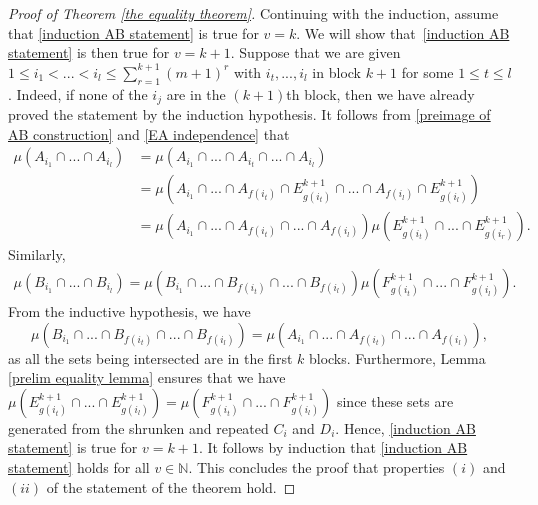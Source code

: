 \documentclass[12pt]{article}
\begin{document}
\begin{proof}[Proof of Theorem \ref{the equality theorem}]
    Continuing with the induction, assume that \eqref{induction AB statement} is true for $v=k$. We will show that~\eqref{induction AB statement} is then true for $v=k+1$. Suppose that we are given $1\leq i_1<...<i_l\leq \sum_{r=1}^{k+1}(m+1)^r$ with $i_t,...,i_l$ in block $k+1$ for some $1 \leq t \leq l$. Indeed, if none of the $i_j$ are in the $(k+1)$th block, then we have already proved the statement by the induction hypothesis. 
    It follows from \eqref{preimage of AB construction} and \eqref{EA independence} that
    \begin{align*}
        \mu(A_{i_1} \cap ... \cap A_{i_l})&=\mu(A_{i_1} \cap ... \cap A_{i_{t}} \cap ... \cap A_{i_l}) \\
        &=\mu\left(A_{i_1} \cap ... \cap {A}_{f(i_t)}\cap {E}_{g(i_t)}^{k+1} \cap ... \cap {A}_{f(i_l)}\cap {E}_{g(i_l)}^{k+1} \right) \\
        &=\mu\left(A_{i_1} \cap ... \cap {A}_{f(i_t)} \cap ... \cap {A}_{f(i_l)}\right) \mu\left({E}_{g(i_t)}^{k+1} \cap ... \cap {E}_{g(i_r)}^{k+1} \right).
    \end{align*}
    Similarly,
    \begin{align*}
        \mu(B_{i_1} \cap ... \cap B_{i_l})=\mu\left(B_{i_1} \cap ... \cap {B}_{f(i_t)} \cap ... \cap {B}_{f(i_l)}\right) \mu\left({F}_{g(i_t)}^{k+1} \cap ... \cap {F}_{g(i_l)}^{k+1} \right).
    \end{align*}
    From the inductive hypothesis, we have 
    \[\mu\left(B_{i_1} \cap ... \cap {B}_{f(i_t)} \cap ... \cap {B}_{f(i_l)}\right)= \mu\left(A_{i_1} \cap ... \cap {A}_{f(i_t)} \cap ... \cap {A}_{f(i_l)} \right),\] as all the sets being intersected are in the first $k$ blocks. Furthermore, Lemma \ref{prelim equality lemma} ensures that we have $\mu\left({E}_{g(i_t)}^{k+1} \cap ... \cap {E}_{g(i_l)}^{k+1} \right)=\mu\left({F}_{g(i_t)}^{k+1} \cap ... \cap {F}_{g(i_l)}^{k+1} \right)$ since these sets are generated from the shrunken and repeated $C_i$ and $D_i$.
    Hence, \eqref{induction AB statement} is true for $v=k+1$. It follows by induction that \eqref{induction AB statement} holds for all $v \in \mathbb{N}$. This concludes the proof that properties $(i)$ and $(ii)$ of the statement of the theorem hold.
    



\end{proof}
\end{document}
